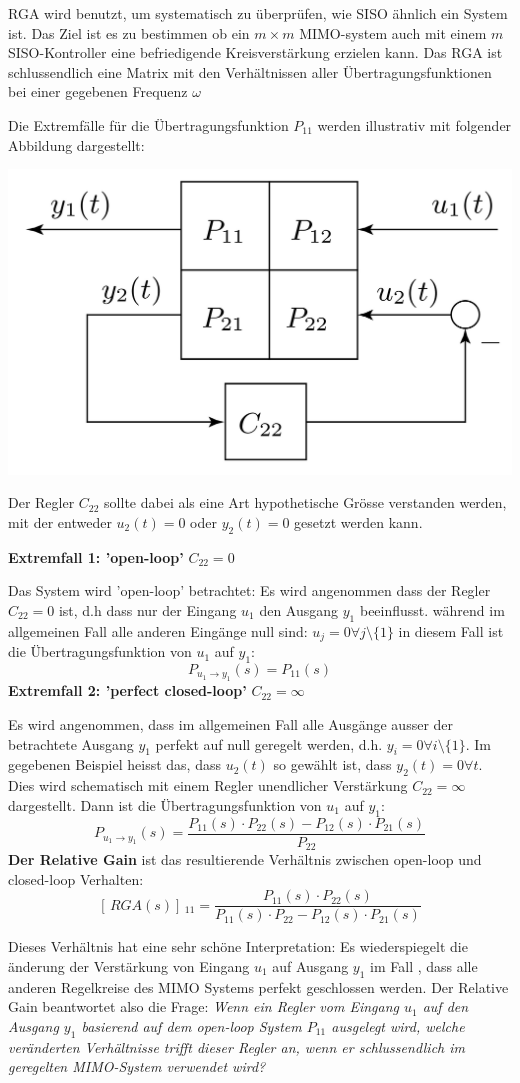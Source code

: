 RGA wird benutzt, um systematisch zu überprüfen, wie SISO ähnlich ein System ist. Das Ziel ist es zu bestimmen ob ein $m \times m$ MIMO-system auch mit einem $m$ SISO-Kontroller eine befriedigende Kreisverstärkung erzielen kann. 
Das RGA ist schlussendlich eine Matrix mit den Verhältnissen aller Übertragungsfunktionen bei einer gegebenen Frequenz $\omega$ 

Die Extremfälle für die Übertragungsfunktion $P_{11}$ werden illustrativ mit folgender Abbildung dargestellt: 
\begin{center}
    \includegraphics[width = 0.4\linewidth]{images/06/RGA.jpg}
\end{center}
Der Regler $C_{22}$ sollte dabei als eine Art hypothetische Grösse verstanden werden, mit der entweder $u_{2}(t) = 0$ oder $y_2(t)=0$ gesetzt werden kann.

\textbf{Extremfall 1: 'open-loop'} $\boxed{C_{22} = 0}$

Das System wird 'open-loop' betrachtet: Es wird angenommen dass der Regler $C_{22} = 0$ ist, d.h dass nur der Eingang $u_1$ den Ausgang $y_1$ beeinflusst. während im allgemeinen Fall alle anderen Eingänge null sind: $u_j=0 \forall j \setminus \{1\}$
in diesem Fall ist die Übertragungsfunktion von $u_1$ auf $y_1$: 
\[P_{u_1\rightarrow y_1}(s) = P_{11}(s)\]
\textbf{Extremfall 2: 'perfect closed-loop'} $\boxed{C_{22}= \infty}$

Es wird angenommen, dass im allgemeinen Fall alle Ausgänge ausser der betrachtete Ausgang $y_1$ perfekt auf null geregelt werden, d.h. $y_i = 0 \forall i \setminus \{1\}$. Im gegebenen Beispiel heisst das, dass $u_2(t)$ so gewählt ist, dass $y_2(t) = 0 \forall t$. Dies wird schematisch mit einem Regler unendlicher Verstärkung $C_{22} = \infty$ dargestellt. Dann ist die Übertragungsfunktion von $u_1$ auf $y_1$:
\[P_{u_1 \rightarrow y_1}(s) = \frac{P_{11}(s)\cdot P_{22}(s) - P_{12}(s)\cdot P_{21}(s)}{P_{22}}\]
\textbf{Der Relative Gain} ist das resultierende Verhältnis zwischen open-loop und closed-loop Verhalten:\[[\,RGA(s)]\,_{11} = \frac{P_{11}(s)\cdot P_{22}(s)}{P_{11}(s)\cdot P_{22}-P_{12}(s)\cdot P_{21}(s)}\]

Dieses Verhältnis hat eine sehr schöne Interpretation: Es wiederspiegelt die änderung der Verstärkung von Eingang $u_1$ auf Ausgang $y_1$ im Fall , dass alle anderen Regelkreise des MIMO Systems perfekt geschlossen werden. Der Relative Gain beantwortet also die Frage: \textit{Wenn ein Regler vom Eingang $u_1$ auf den Ausgang $y_1$ basierend auf dem open-loop System $P_{11}$ ausgelegt wird, welche veränderten Verhältnisse trifft dieser Regler an, wenn er schlussendlich im geregelten MIMO-System verwendet wird?}

